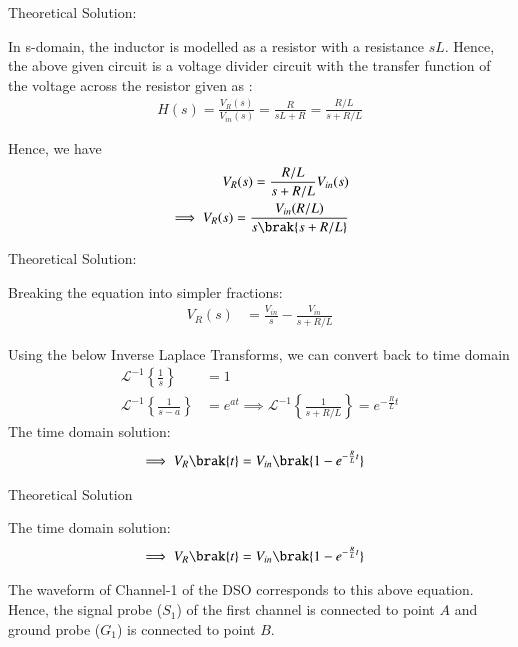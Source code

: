 \documentclass{beamer}
\begin{document}
\begin{frame}{Theoretical Solution:}

In s-domain, the inductor is modelled as a resistor with a resistance $sL$. Hence, the above given circuit is a voltage divider circuit with the transfer function of the voltage across the resistor given as :
\begin{align}
    H(s) = \frac{V_R(s)}{V_{in}(s)} = \frac{R}{sL + R} =  \frac{R/L}{s + R/L}
\end{align}

Hence, we have
\begin{align}
    V_R(s) = \frac{R/L}{s + R/L}V_{in}(s)\\
    \implies V_R(s) = \frac{V_{in}(R/L)}{s\brak{s + R/L}}
\end{align}


    
\end{frame}

\begin{frame}{Theoretical Solution:}

Breaking the equation into simpler fractions:
\begin{align}
    V_R(s) &= \frac{V_{in}}{s} - \frac{V_{in}}{s + R/L}
\end{align}

Using the below Inverse Laplace Transforms, we can convert back to time domain
\begin{align*}
    \mathcal{L}^{-1}\left\{\frac{1}{s}\right\} &= 1 \\
    \mathcal{L}^{-1}\left\{\frac{1}{s - a}\right\} &= e^{at} \implies \mathcal{L}^{-1}\left\{\frac{1}{s + R/L}\right\} = e^{-\frac{R}{L}t}
\end{align*}
The time domain solution:
\begin{align}
    \implies V_R\brak{t} &= V_{in}\brak{1 - e^{-\frac{R}{L}t}}
\end{align}
    
\end{frame}

\begin{frame}{Theoretical Solution}

The time domain solution:
\begin{align}
    \implies V_R\brak{t} &= V_{in}\brak{1 - e^{-\frac{R}{L}t}}
\end{align}

The waveform of Channel-1 of the DSO corresponds to this above equation. Hence, the signal probe ($S_1$) of the first channel is connected to point $A$ and ground probe ($G_1$) is connected to point $B$. 
    
\end{frame}
\end{document}
